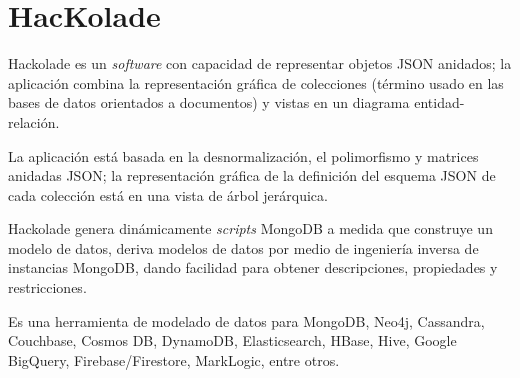 \section{HacKolade}
Hackolade es un \textit{software} con capacidad de representar objetos JSON anidados; la aplicación combina la representación gráfica de colecciones (término usado en las bases de datos orientados a documentos) y vistas en un diagrama entidad-relación.


La aplicación está basada en la desnormalización, el polimorfismo y matrices anidadas JSON; la representación gráfica de la definición del esquema JSON de cada colección está en una vista de árbol jerárquica. 


Hackolade genera dinámicamente \textit{scripts} MongoDB a medida que construye un modelo de datos, deriva modelos de datos por medio de ingeniería inversa de instancias MongoDB, dando facilidad para obtener descripciones, propiedades y restricciones.


Es una herramienta de modelado de datos para MongoDB, Neo4j, Cassandra, Couchbase, Cosmos DB, DynamoDB, Elasticsearch, HBase, Hive, Google BigQuery, Firebase/Firestore, MarkLogic, entre otros.